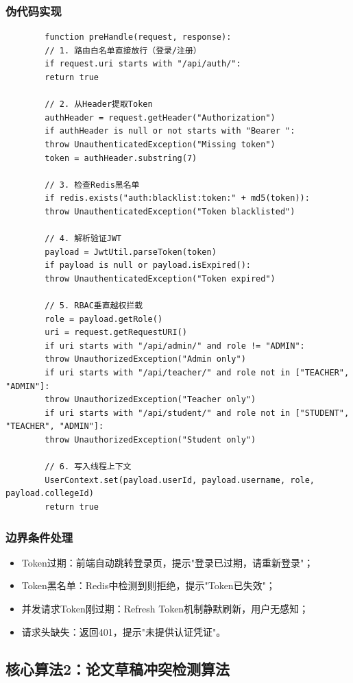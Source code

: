 \documentclass{../template/softeng}
\begin{document}
	\subsubsection{伪代码实现}
	\begin{verbatim}
		function preHandle(request, response):
		// 1. 路由白名单直接放行（登录/注册）
		if request.uri starts with "/api/auth/":
		return true

		// 2. 从Header提取Token
		authHeader = request.getHeader("Authorization")
		if authHeader is null or not starts with "Bearer ":
		throw UnauthenticatedException("Missing token")
		token = authHeader.substring(7)

		// 3. 检查Redis黑名单
		if redis.exists("auth:blacklist:token:" + md5(token)):
		throw UnauthenticatedException("Token blacklisted")

		// 4. 解析验证JWT
		payload = JwtUtil.parseToken(token)
		if payload is null or payload.isExpired():
		throw UnauthenticatedException("Token expired")

		// 5. RBAC垂直越权拦截
		role = payload.getRole()
		uri = request.getRequestURI()
		if uri starts with "/api/admin/" and role != "ADMIN":
		throw UnauthorizedException("Admin only")
		if uri starts with "/api/teacher/" and role not in ["TEACHER", "ADMIN"]:
		throw UnauthorizedException("Teacher only")
		if uri starts with "/api/student/" and role not in ["STUDENT", "TEACHER", "ADMIN"]:
		throw UnauthorizedException("Student only")

		// 6. 写入线程上下文
		UserContext.set(payload.userId, payload.username, role, payload.collegeId)
		return true
	\end{verbatim}

	\subsubsection{边界条件处理}
	\begin{itemize}
		\item Token过期：前端自动跳转登录页，提示"登录已过期，请重新登录"；
		\item Token黑名单：Redis中检测到则拒绝，提示"Token已失效"；
		\item 并发请求Token刚过期：Refresh Token机制静默刷新，用户无感知；
		\item 请求头缺失：返回401，提示"未提供认证凭证"。
	\end{itemize}

	\subsection{核心算法2：论文草稿冲突检测算法}
\end{document}
